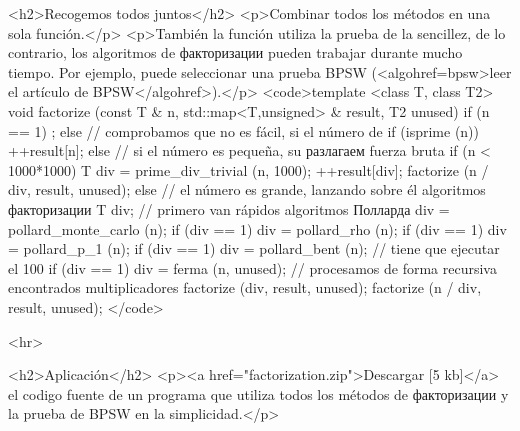 <h2>Recogemos todos juntos</h2>
<p>Combinar todos los métodos en una sola función.</p>
<p>También la función utiliza la prueba de la sencillez, de lo contrario, los algoritmos de факторизации pueden trabajar durante mucho tiempo. Por ejemplo, puede seleccionar una prueba BPSW (<algohref=bpsw>leer el artículo de BPSW</algohref>).</p>
<code>template <class T, class T2>
void factorize (const T & n, std::map<T,unsigned> & result, T2 unused)
{
if (n == 1)
;
else
// comprobamos que no es fácil, si el número de
if (isprime (n))
++result[n];
else
// si el número es pequeña, su разлагаем fuerza bruta
if (n < 1000*1000)
{
T div = prime_div_trivial (n, 1000);
++result[div];
factorize (n / div, result, unused);
}
else
{
// el número es grande, lanzando sobre él algoritmos факторизации
T div;
// primero van rápidos algoritmos Полларда
div = pollard_monte_carlo (n);
if (div == 1)
div = pollard_rho (n);
if (div == 1)
div = pollard_p_1 (n);
if (div == 1)
div = pollard_bent (n);
// tiene que ejecutar el 100%
if (div == 1)
div = ferma (n, unused);
// procesamos de forma recursiva encontrados multiplicadores
factorize (div, result, unused);
factorize (n / div, result, unused);
}
}</code>

<hr>

<h2>Aplicación</h2>
<p><a href="factorization.zip">Descargar [5 kb]</a> el codigo fuente de un programa que utiliza todos los métodos de факторизации y la prueba de BPSW en la simplicidad.</p>